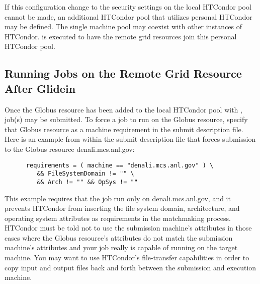 If this configuration change to the security settings on
the local HTCondor pool cannot be made,
an additional HTCondor pool that utilizes
personal HTCondor may be defined.
The single machine pool
may coexist with other instances of HTCondor.
 is executed to have the remote grid
resources join this personal HTCondor pool.

\subsection{Running Jobs on the Remote Grid Resource After Glidein }

Once the Globus resource has been added to the local HTCondor
pool with ,
job(s) may be submitted.
To force a job to run on the Globus resource,
specify that Globus resource as a machine requirement
in the submit description file. 
Here is an example from within the submit description file
that forces submission to the Globus resource denali.mcs.anl.gov:
\begin{verbatim}
      requirements = ( machine == "denali.mcs.anl.gov" ) \
         && FileSystemDomain != "" \
         && Arch != "" && OpSys != ""
\end{verbatim}
This example requires that the job run only on denali.mcs.anl.gov,
and it prevents HTCondor from inserting the file system domain,
architecture, and operating system attributes as requirements
in the matchmaking process.
HTCondor must be told not to use the submission machine's
attributes in those cases
where the Globus resource's attributes
do not match the submission machine's attributes and your job
really is capable of running on the target machine.  You
may want to use HTCondor's file-transfer capabilities in order
to copy input and output files back and forth between the submission
and execution machine.
